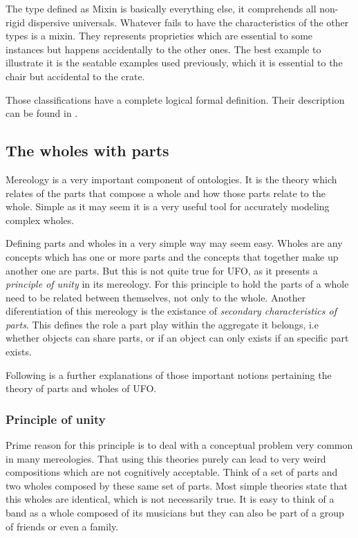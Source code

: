 The type defined as Mixin is basically everything else, it comprehends all non-rigid dispersive universals. Whatever fails to have the characteristics of the other types is a mixin. They represents proprieties which are essential to some instances but happens accidentally to the other ones. The best example to illustrate it is the seatable examples used previously, which it is essential to the chair but accidental to the crate.

Those classifications have a complete logical formal definition. Their description can be found in \cite{guizzardi_ontological_2005}.

\subsection{The wholes with parts}

Mereology is a very important component of ontologies. It is the theory which relates of the parts that compose a whole and how those parts relate to the whole. Simple as it may seem it is a very useful tool for accurately modeling complex wholes.

Defining parts and wholes in a very simple way may seem easy. Wholes are any concepts which has one or more parts and the concepts that together make up another one are parts. But this is not quite true for UFO, as it presents a \textit{principle of unity} in its mereology. For this principle to hold the parts of a whole need to be related between themselves, not only to the whole. Another diferentiation of this mereology is the existance of \textit{secondary characteristics of parts}. This defines the role a part play within the aggregate it belongs, i.e whether objects can share parts, or if an object can only exists if an specific part exists. 

Following is a further explanations of those important notions pertaining the theory of parts and wholes of UFO.

\subsubsection{Principle of unity}

Prime reason for this principle is to deal with a conceptual problem very common in many mereologies. That using this theories purely can lead to very weird compositions which are not cognitively acceptable. Think of a set of parts and two wholes composed by these same set of parts. Most simple theories state that this wholes are identical, which is not necessarily true. It is easy to think of a band as a whole composed of its musicians but they can also be part of a group of friends or even a family. 

